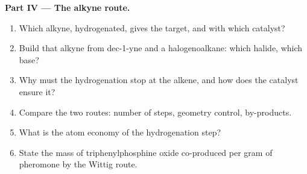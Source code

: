 \begin{problem}
\medskip
\noindent\textbf{Part IV --- The alkyne route.}
\begin{enumerate}[resume]
  \item Which alkyne, hydrogenated, gives the target, and with which catalyst?
  \item Build that alkyne from dec-1-yne and a halogenoalkane: which halide, which base?
  \item Why must the hydrogenation stop at the alkene, and how does the catalyst ensure it?
  \item Compare the two routes: number of steps, geometry control, by-products.
  \item What is the atom economy of the hydrogenation step?
  \item State the mass of triphenylphosphine oxide co-produced per gram of pheromone by the Wittig
        route.
\end{enumerate}
\end{problem}
